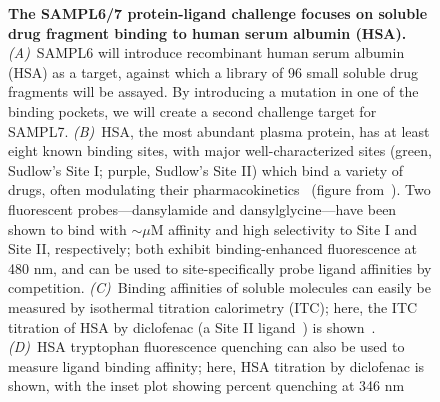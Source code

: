 \documentclass[11pt]{article}
\begin{document}
\begin{figure}[h]
\begin{centering}

\end{centering}
\vspace{0.1in}
\caption{\footnotesize {\bf The SAMPL6/7 protein-ligand challenge focuses on soluble drug fragment binding to human serum albumin (HSA).}
\emph{(A)}~SAMPL6 will introduce recombinant human serum albumin (HSA) as a target, against which a library of 96 small soluble drug fragments will be assayed.
By introducing a mutation in one of the binding pockets, we will create a second challenge target for SAMPL7.
\emph{(B)}~HSA, the most abundant plasma protein, has at least eight known binding sites, with major well-characterized sites (green, Sudlow's Site I; purple, Sudlow's Site II) which bind a variety of drugs, often modulating their pharmacokinetics~\cite{Fasano:2005:IUBMBLife(InternationalUnionofBiochemistryandMolecularBiology:Life)} (figure from~\cite{Hall:2013:JournalofChemicalInformationandModeling}).
Two fluorescent probes---dansylamide and dansylglycine---have been shown to bind with $\sim$$\mu$M affinity and high selectivity to Site I and Site II, respectively; both exhibit binding-enhanced fluorescence at 480 nm, and can be used to site-specifically probe ligand affinities by competition.
\emph{(C)}~Binding affinities of soluble molecules can easily be measured by isothermal titration calorimetry (ITC); here, the ITC titration of HSA by diclofenac (a Site II ligand~\cite{Rafols:2014:Talanta}) is shown~\cite{Bou-Abdallah:2016:TheJournalofChemicalThermodynamics}. 
\emph{(D)}~HSA tryptophan fluorescence quenching can also be used to measure ligand binding affinity; here, HSA titration by diclofenac is shown, with the inset plot showing percent quenching at 346 nm~\cite{Bou-Abdallah:2016:TheJournalofChemicalThermodynamics}
\label{figure:hsa-challenge}}
\end{figure}
\end{document}
